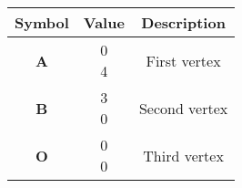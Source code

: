 \begin{tabular}[12pt]{ |c|c|c|}
    \hline
    \textbf{Symbol} & \textbf{Value} & \textbf{Description} \\
    \hline
    \textbf{A} & \myvec{0\\4} & First vertex\\
    \hline 
    \textbf{B} & \myvec{3\\0} & Second vertex\\
    \hline
    \textbf{O} & \myvec{0\\0} & Third vertex\\
    \hline
    \end{tabular}
